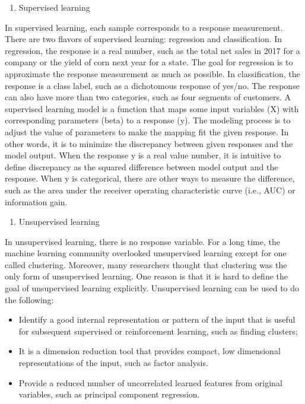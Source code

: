\documentclass[12pt,]{krantz}
\providecommand{\tightlist}{%
  \setlength{\itemsep}{0pt}\setlength{\parskip}{0pt}}
\begin{document}
\begin{enumerate}
\def\labelenumi{(\arabic{enumi})}
\tightlist
\item
  Supervised learning
\end{enumerate}

In supervised learning, each sample corresponds to a response measurement. There are two flavors of supervised learning: regression and classification. In regression, the response is a real number, such as the total net sales in 2017 for a company or the yield of corn next year for a state. The goal for regression is to approximate the response measurement as much as possible. In classification, the response is a class label, such as a dichotomous response of yes/no. The response can also have more than two categories, such as four segments of customers. A supervised learning model is a function that maps some input variables (X) with corresponding parameters (beta) to a response (y). The modeling process is to adjust the value of parameters to make the mapping fit the given response. In other words, it is to minimize the discrepancy between given responses and the model output. When the response y is a real value number, it is intuitive to define discrepancy as the squared difference between model output and the response. When y is categorical, there are other ways to measure the difference, such as the area under the receiver operating characteristic curve (i.e., AUC) or information gain.

\begin{enumerate}
\def\labelenumi{(\arabic{enumi})}
\setcounter{enumi}{1}
\tightlist
\item
  Unsupervised learning
\end{enumerate}

In unsupervised learning, there is no response variable. For a long time, the machine learning community overlooked unsupervised learning except for one called clustering. Moreover, many researchers thought that clustering was the only form of unsupervised learning. One reason is that it is hard to define the goal of unsupervised learning explicitly. Unsupervised learning can be used to do the following:

\begin{itemize}
\item
  Identify a good internal representation or pattern of the input that is useful for subsequent supervised or reinforcement learning, such as finding clusters;
\item
  It is a dimension reduction tool that provides compact, low dimensional representations of the input, such as factor analysis.
\item
  Provide a reduced number of uncorrelated learned features from original variables, such as principal component regression.
\end{itemize}
\end{document}
